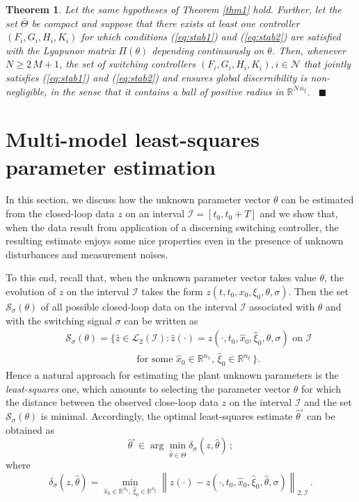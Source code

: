\documentclass[letterpaper, 10 pt, conference]{ieeetran}
\def\qedp{\hspace*{\fill}~{\tiny $\blacksquare$}}
\newtheorem{theorem}{Theorem}
\begin{document}
\begin{theorem} \label{thm2}
Let the same hypotheses of Theorem \ref{thm1} hold. Further, let the set $\bar \Theta$ be compact and suppose that there exists at least
one controller $(F_i, G_i, H_i, K_i)$ for which conditions (\ref{eq:stab1}) and (\ref{eq:stab2}) are satisfied with the Lyapunov matrix $\Pi (\theta)$
depending continuously on $\theta$.
Then, whenever $N \ge 2 \, M +1$, the set of switching controllers  $(F_i, G_i, H_i, K_i), i  \in \mathcal N$ that jointly satisfies (\ref{eq:stab1}) and (\ref{eq:stab2}) and ensures global discernibility
is non-negligible, in the sense that it contains a ball of positive radius in 
$\mathbb R^{N \, \bar n_\xi}$. \qedp 
\end{theorem} 


\section{Multi-model least-squares parameter estimation}


In this section, we discuss how the unknown parameter vector $\theta$ can be estimated from the closed-loop data $z$ on an interval
$\mathcal I = [t_0, t_0+T]$ and we show that, when the data result from application of a discerning switching controller, the resulting estimate enjoys some nice 
properties even in the presence of unknown disturbances and measurement noises.

To this end, recall that, when the unknown parameter vector takes value $\theta$, the evolution of $z$ on the interval
$\mathcal I$ takes the form $z(t,t_0,x_0,\xi_0,\theta,\sigma)$. Then the set $\mathcal S_\sigma (\theta)$ of all possible
closed-loop data on the interval $\mathcal I$ associated with $\theta$ and with the switching signal $\sigma$ can be written as
{\setlength\arraycolsep{0pt} 
\begin{eqnarray*}
&& \mathcal S_\sigma (\theta) = \bigg \{  \hat z \in \mathcal L_2 (\mathcal I): \hat z(\cdot) = z(\cdot,t_0,\hat x_0, \hat \xi_0,\theta,\sigma) 
\mbox{ on } \mathcal I \\ && \quad \quad \quad \quad \qquad \quad \mbox{ for some } \hat x_0 \in \mathbb R^{n_x} , \, \hat \xi_0  \in \mathbb R^{n_\xi} \, \bigg \} .
\end{eqnarray*}}Hence a natural approach for estimating the plant unknown parameters is the {\em least-squares} one, which
amounts to selecting the parameter vector $\theta$ for which the distance between the observed close-loop data $z$ on the interval 
$\mathcal I$ and the set $\mathcal S_\sigma (\theta)$
is minimal. Accordingly, the optimal least-squares estimate $\hat \theta^\circ$ can be obtained as
\begin{equation}\label{eq:MDC}
\hat \theta^\circ  \in \arg \min_{\hat \theta \in \Theta}{\delta_\sigma(z,\hat \theta)} \, ;
\end{equation}
where
\begin{equation}
\delta_\sigma(z,\hat \theta)
 = \min_{\hat x_0 \in \mathbb R^{n_x}, \, \hat \xi_0 \in \mathbb R^{n_\xi}} \left \| z(\cdot) -  z(\cdot,t_0,\hat x_0, \hat \xi_0,\hat \theta,\sigma)  \right \|_{2,\mathcal I} \, .  
 \label{eq:distance}
\end{equation}
\end{document}
